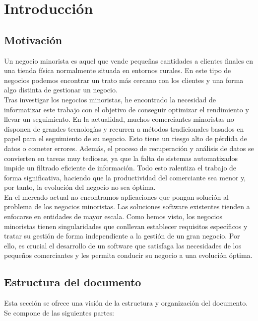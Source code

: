 \chapter{Introducción}
\label{chap:introduction}

\section{Motivación}
\label{sec:motivation}
Un negocio minorista es aquel que vende pequeñas cantidades a clientes finales en una tienda física normalmente situada en entornos rurales. En este tipo de negocios podemos encontrar un trato más cercano con los clientes y una forma algo distinta de gestionar un negocio. \\

Tras investigar los negocios minoristas, he encontrado la necesidad de informatizar este trabajo con el objetivo de conseguir optimizar el rendimiento y llevar un seguimiento. En la actualidad, muchos comerciantes minoristas no disponen de grandes tecnologías y recurren a métodos tradicionales basados en papel para el seguimiento de su negocio. Esto tiene un riesgo alto de pérdida de datos o cometer errores. 
Además, el proceso de recuperación y análisis de datos se convierten en tareas muy tediosas, ya que la falta de sistemas automatizados impide un filtrado eficiente de información. Todo esto ralentiza el trabajo de forma significativa, haciendo que la productividad del comerciante sea menor y, por tanto, la evolución del negocio no sea óptima. \\

En el mercado actual no encontramos aplicaciones que pongan solución al problema de los negocios minoristas. Las soluciones software existentes tienden a enfocarse en entidades de mayor escala. Como hemos visto, los negocios minoristas tienen singularidades que conllevan establecer requisitos específicos y tratar su gestión de forma independiente a la gestión de un gran negocio. Por ello, es crucial el desarrollo de un software que satisfaga las necesidades de los pequeños comerciantes y les permita conducir su negocio a una evolución óptima. 

  

\section{Estructura del documento}
\label{sec:document_structure}
Esta sección se ofrece una visión de la estructura y organización del documento. Se compone de las siguientes partes: 

